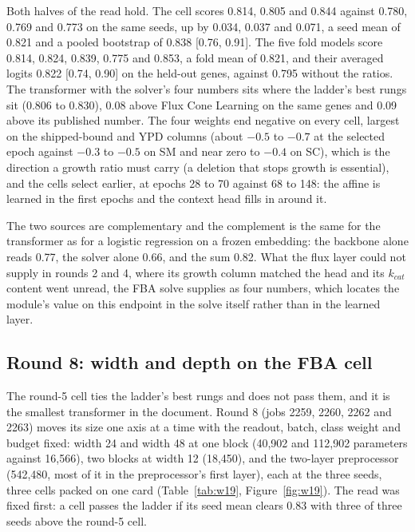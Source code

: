 Both halves of the read hold. The cell scores 0.814, 0.805 and 0.844 against 0.780, 0.769
and 0.773 on the same seeds, up by 0.034, 0.037 and 0.071, a seed mean of 0.821 and a
pooled bootstrap of 0.838 [0.76, 0.91]. The five fold models score 0.814, 0.824, 0.839,
0.775 and 0.853, a fold mean of 0.821, and their averaged logits 0.822 [0.74, 0.90] on
the held-out genes, against 0.795 without the ratios. The transformer with the solver's
four numbers sits where the ladder's best rungs sit (0.806 to 0.830), 0.08 above Flux
Cone Learning on the same genes and 0.09 above its published number. The four weights
end negative on every cell, largest on the shipped-bound and YPD columns (about $-0.5$
to $-0.7$ at the selected epoch against $-0.3$ to $-0.5$ on SM and near zero to $-0.4$
on SC), which is the direction a growth ratio must carry (a deletion that stops growth is
essential), and the cells select earlier, at epochs 28 to 70 against 68 to 148: the affine
is learned in the first epochs and the context head fills in around it.

The two sources are complementary and the complement is the same for the transformer
as for a logistic regression on a frozen embedding: the backbone alone reads 0.77, the
solver alone 0.66, and the sum 0.82. What the flux layer could not supply in rounds 2 and
4, where its growth column matched the head and its $k_{cat}$ content went unread, the
FBA solve supplies as four numbers, which locates the module's value on this endpoint in
the solve itself rather than in the learned layer.

\subsection{Round 8: width and depth on the FBA cell}

The round-5 cell ties the ladder's best rungs and does not pass them, and it is the
smallest transformer in the document. Round 8 (jobs 2259, 2260, 2262 and 2263) moves its
size one axis at a time with the readout, batch, class weight and budget fixed: width 24
and width 48 at one block (40,902 and 112,902 parameters against 16,566), two blocks at
width 12 (18,450), and the two-layer preprocessor (542,480, most of it in the
preprocessor's first layer), each at the three seeds, three cells packed on one card
(Table~\ref{tab:w19}, Figure~\ref{fig:w19}). The read was fixed first: a cell passes the
ladder if its seed mean clears 0.83 with three of three seeds above the round-5 cell.

